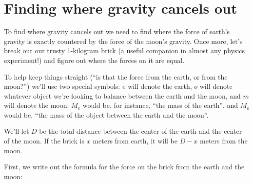 \documentclass[10pt,letterpaper]{report}
\begin{document}
\section{Finding where gravity cancels out}

To find where gravity cancels out we need to find where the force of
earth's gravity is exactly countered by the force of the moon's
gravity.  Once more, let's break out our trusty 1-kilogram brick (a
useful companion in almost any physics experiment!) and figure out where the forces on it are equal.

To help keep things straight (``is that the force from the earth, or from the
moon?'') we'll use two special symbols: $e$ will denote the earth, $o$
will denote whatever object we're looking to balance between the earth
and the moon, and $m$ will denote the moon.  $M_{e}$ would be, for
instance, ``the mass of the earth'', and $M_{o}$ would be,
``the mass of the object between the earth and the moon''.

We'll let $D$ be the total distance between the center of the earth
and the center of the moon.  If the brick is $x$ meters from earth, it
will be $D-x$ meters from the moon.

First, we write out the formula for the force on the brick from the earth and
the moon:

\newpage
\end{document}
